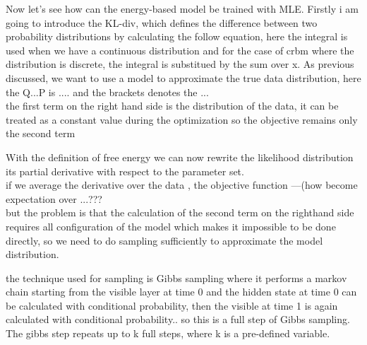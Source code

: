 \begin{frame}
 Now let's see how can the energy-based model be trained with MLE. 
 Firstly i am going to introduce the KL-div, which defines the difference between two probability distributions by calculating the follow equation, here the integral is used when we have a continuous distribution and for the case of crbm where the distribution is discrete, the integral is substitued by the sum over x. 
 As previous discussed, we want to use a model to approximate the true data distribution, here the Q...P is .... and the brackets denotes the ...\\
 the first term on the right hand side is the distribution of the data, it can be treated as a constant value during the optimization so the objective remains only the second term
\end{frame}

\begin{frame}
 With the definition of free energy we can now rewrite the likelihood distribution its partial derivative with respect to the parameter set. \\
 if we average the derivative over the data , the objective function ---(how become expectation over ...???\\
 but the problem is that the calculation of the second term on the righthand side requires all configuration of the model which makes it impossible to be done directly, so we need to do sampling sufficiently to approximate the model distribution.
\end{frame}

\begin{frame}
 the technique used for sampling is Gibbs sampling where it performs a markov chain starting from the visible layer at time 0 and the hidden state at time 0 can be calculated with conditional probability, then the visible at time 1 is again calculated with conditional probability.. so this is a full step of Gibbs sampling. \\
 The gibbs step repeats up to k full steps, where k is a pre-defined variable. 
\end{frame}

